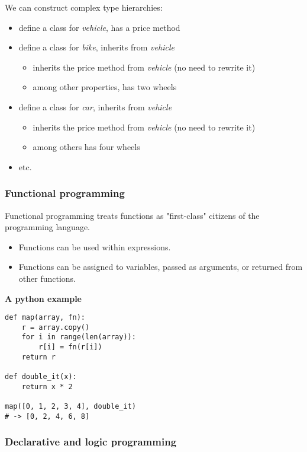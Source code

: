 \documentclass[12pt]{article}
\begin{document}
We can construct complex type hierarchies:
\begin{itemize}
    \item define a class for \emph{vehicle}, has a price method
    \item define a class for \emph{bike}, inherits from \emph{vehicle}
    \begin{itemize}
        \item inherits the price method from \emph{vehicle} (no need to rewrite it)
        \item among other properties, has two wheels
    \end{itemize}
    \item define a class for \emph{car}, inherits from \emph{vehicle}
    \begin{itemize}
        \item inherits the price method from \emph{vehicle} (no need to rewrite it)
        \item among others has four wheels
    \end{itemize}
    \item etc.
\end{itemize}




\subsubsection{Functional programming}

Functional programming treats functions as "first-class" citizens of the programming language.

\begin{itemize}
    \item Functions can be used within expressions.
    \item Functions can be assigned to variables, passed as arguments, or returned from other functions.
\end{itemize}
\textbf{A python example}
\begin{verbatim}
def map(array, fn):
    r = array.copy()
    for i in range(len(array)):
        r[i] = fn(r[i])
    return r

def double_it(x):
    return x * 2

map([0, 1, 2, 3, 4], double_it)
# -> [0, 2, 4, 6, 8]
\end{verbatim}

\subsubsection{Declarative and logic programming}
\end{document}
